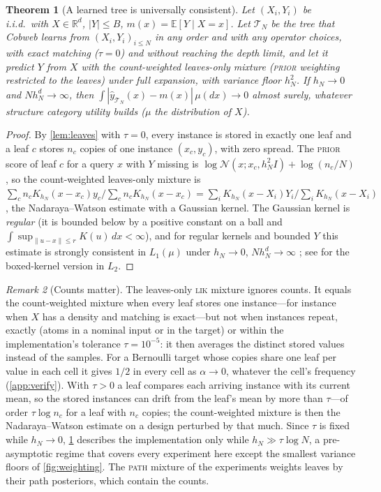 \documentclass[11pt]{article}
\newtheorem{theorem}{Theorem}
\theoremstyle{definition}
\theoremstyle{remark}
\newtheorem{remark}[theorem]{Remark}
\newcommand{\R}{\mathbb{R}}
\newcommand{\E}{\mathbb{E}}
\newcommand{\N}{\mathcal{N}}
\newcommand{\T}{\mathcal{T}}
\newcommand{\hy}{\hat{y}}
\begin{document}
\begin{theorem}[A learned tree is universally consistent]\label{thm:consistency}
Let $(X_i,Y_i)$ be i.i.d.\ with $X\in\R^d$, $|Y|\le B$, $m(x)=\E[Y\mid X=x]$.
Let $\T_N$ be the tree that Cobweb learns from $(X_i,Y_i)_{i\le N}$ in any order and with
any operator choices, with exact matching ($\tau=0$) and without reaching the depth
limit, and let it predict $Y$ from $X$ with the \emph{count-weighted} leaves-only mixture
(\textsc{prior} weighting restricted to the leaves) under full expansion, with variance
floor $h_N^2$.  If $h_N\to0$ and $Nh_N^d\to\infty$, then
$\int|\hy_{\T_N}(x)-m(x)|\,\mu(dx)\to0$ almost surely, whatever structure category
utility builds ($\mu$ the distribution of $X$).
\end{theorem}
\begin{proof}
By \cref{lem:leaves} with $\tau=0$, every instance is stored in exactly one leaf and a
leaf $c$ stores $n_c$ copies of one instance $(x_c,y_c)$, with zero spread.  The
\textsc{prior} score of leaf $c$ for a query $x$ with $Y$ missing is
$\log\N(x;x_c,h_N^2I)+\log(n_c/N)$, so the count-weighted leaves-only mixture is
$\sum_cn_cK_{h_N}(x-x_c)y_c/\sum_cn_cK_{h_N}(x-x_c)=\sum_iK_{h_N}(x-X_i)Y_i/\sum_iK_{h_N}(x-X_i)$,
the Nadaraya--Watson estimate with a Gaussian kernel.  The Gaussian kernel is \emph{regular} (it is bounded below by a
positive constant on a ball and $\int\sup_{\|u-x\|\le r}K(u)\,dx<\infty$), and for
regular kernels and bounded $Y$ this estimate is strongly consistent in $L_1(\mu)$
under $h_N\to0$, $Nh_N^d\to\infty$ \citep{devroye1989}; see \citet[Ch.~5]{gyorfi2002}
for the boxed-kernel version in $L_2$.
\end{proof}

\begin{remark}[Counts matter]\label{rem:counts}
The leaves-only \textsc{lik} mixture ignores counts.  It equals the count-weighted mixture
when every leaf stores one instance---for instance when $X$ has a density and matching is
exact---but not when instances repeat, exactly (atoms in a nominal input or in the target)
or within the implementation's tolerance $\tau=10^{-5}$: it then averages the distinct
stored values instead of the samples.  For a Bernoulli target whose copies share one leaf
per value in each cell it gives $1/2$ in every cell as $\alpha\to0$, whatever the cell's
frequency (\cref{app:verify}).  With $\tau>0$ a leaf compares each arriving instance with its current
mean, so the stored instances can drift from the leaf's mean by more than $\tau$---of order
$\tau\log n_c$ for a leaf with $n_c$ copies; the count-weighted mixture is then the
Nadaraya--Watson estimate on a design perturbed by that much.  Since $\tau$ is fixed while
$h_N\to0$, \cref{thm:consistency} describes the implementation only while
$h_N\gg\tau\log N$, a pre-asymptotic regime that covers every experiment here except the
smallest variance floors of \cref{fig:weighting}.  The
\textsc{path} mixture of the experiments weights leaves by their path posteriors, which
contain the counts.
\end{remark}
\end{document}
